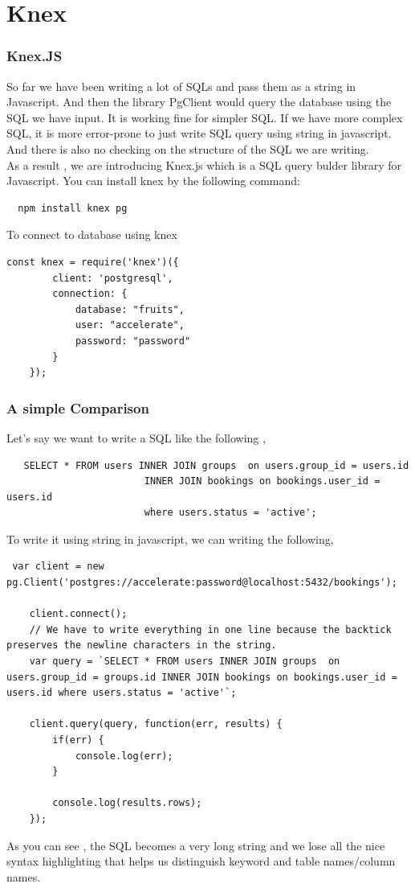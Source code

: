 \documentclass[a4paper]{article}
\begin{document}
\section{Knex}
\subsubsection{Knex.JS}
So far we have been writing a lot of SQLs and pass them as a string in Javascript. And then the library PgClient would query the database using the SQL we have input. It is working fine for simpler SQL. If we have more complex SQL, it is more error-prone to just write SQL query using string in javascript. And there is also no checking on the structure of the SQL we are writing.\\

As a result , we are introducing Knex.js which is a SQL query bulder library for Javascript. You can install knex by the following command:
\begin{lstlisting}
  npm install knex pg
\end{lstlisting}
To connect to database using knex
\begin{lstlisting}
const knex = require('knex')({
        client: 'postgresql',
        connection: {
            database: "fruits",
            user: "accelerate",
            password: "password"
        }
    });
\end{lstlisting}
\subsubsection{A simple Comparison}
Let’s say we want to write a SQL like the following ,
\begin{lstlisting}
   SELECT * FROM users INNER JOIN groups  on users.group_id = users.id 
                        INNER JOIN bookings on bookings.user_id = users.id 
                        where users.status = 'active';
\end{lstlisting}
To write it using string in javascript, we can writing the following,
\begin{lstlisting}
 var client = new pg.Client('postgres://accelerate:password@localhost:5432/bookings');

    client.connect();
    // We have to write everything in one line because the backtick preserves the newline characters in the string.
    var query = `SELECT * FROM users INNER JOIN groups  on users.group_id = groups.id INNER JOIN bookings on bookings.user_id = users.id where users.status = 'active'`;

    client.query(query, function(err, results) {
        if(err) {
            console.log(err);
        }

        console.log(results.rows);
    });
\end{lstlisting}
As you can see , the SQL becomes a very long string and we lose all the nice syntax highlighting that helps us distinguish keyword and table names/column names.\\
\end{document}
